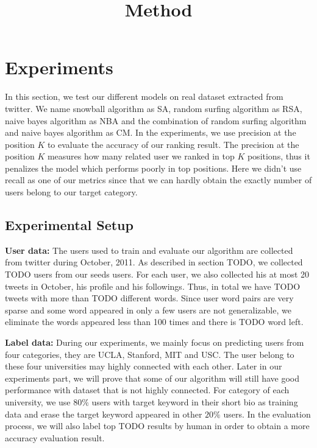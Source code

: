 \documentclass{article}
\begin{document}
\title{Method}
\maketitle \else \fi

\section{Experiments}\label{sec:experiment}
In this section, we test our different models on real dataset extracted from twitter. We name snowball algorithm as SA, random surfing algorithm as RSA, naive bayes algorithm as NBA and the combination of random surfing algorithm and naive bayes algorithm as CM. In the experiments, we use precision at the position $K$ to evaluate the accuracy of our ranking result. The precision at the position $K$ measures how many related user we ranked in top $K$ positions, thus it penalizes the model which performs poorly in top positions. Here we didn't use recall as one of our metrics since that we can hardly obtain the exactly number of users belong to our target category.

\subsection{Experimental Setup}
\textbf{User data:} The users used to train and evaluate our algorithm are collected from twitter during October, 2011. As described in section TODO, we collected TODO users from our seeds users. For each user, we also collected his at most 20 tweets in October, his profile and his followings. Thus, in total we have TODO tweets with more than TODO different words. Since user word pairs are very sparse and some word appeared in only a few users are not generalizable, we eliminate the words appeared less than 100 times and there is TODO word left.

\textbf{Label data:} During our experiments, we mainly focus on predicting users from four categories, they are UCLA, Stanford, MIT and USC. The user belong to these four universities may highly connected with each other. Later in our experiments part, we will prove that some of our algorithm will still have good performance with dataset that is not highly connected. For category of each university, we use $80\%$ users with target keyword in their short bio as training data and erase the target keyword appeared in other $20\%$ users. In the evaluation process, we will also label top TODO results by human in order to obtain a more accuracy evaluation result.
\end{document}
